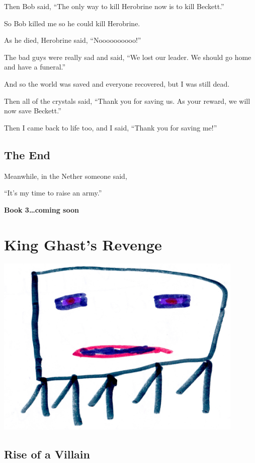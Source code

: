 \documentclass[booklet, twoside, 12pt]{krantz}
\begin{document}
Then Bob said, ``The only way to kill Herobrine now is to kill
Beckett.''

So Bob killed me so he could kill Herobrine.

As he died, Herobrine said, ``Noooooooooo!''

The bad guys were really sad and said, ``We lost our leader. We should
go home and have a funeral.''

And so the world was saved and everyone recovered, but I was still dead.

Then all of the crystals said, ``Thank you for saving us. As your
reward, we will now save Beckett.''

Then I came back to life too, and I said, ``Thank you for saving me!''

\hypertarget{the-end}{%
\section*{The End}\label{the-end}}


Meanwhile, in the Nether someone said,

``It's my time to raise an army.''

\textbf{Book 3\ldots{}coming soon}

\hypertarget{king-ghasts-revenge}{%
\chapter{King Ghast's Revenge}\label{king-ghasts-revenge}}

\includegraphics[width=4.6875in,height=\textheight]{img/king-ghast/00-ghast.jpg}

\clearpage

\hypertarget{rise-of-a-villain}{%
\section{Rise of a Villain}\label{rise-of-a-villain}}
\end{document}
